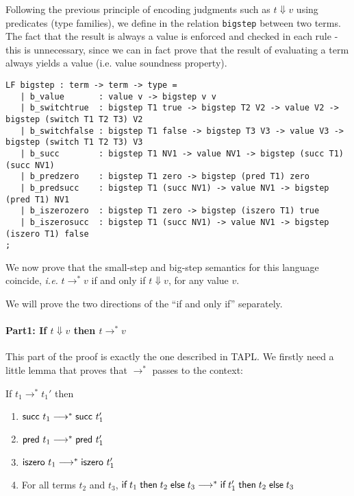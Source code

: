 Following the previous principle of encoding judgments such as $t \Downarrow v$
using predicates (type families), we define in \beluga the relation
\lstinline!bigstep! between two terms. The fact that the result is always a
value is enforced and checked in each rule - this is unnecessary, since we can
in fact prove that the result of evaluating a term always yields a value
(i.e. value soundness property).

\begin{lstlisting}
LF bigstep : term -> term -> type =
   | b_value       : value v -> bigstep v v
   | b_switchtrue  : bigstep T1 true -> bigstep T2 V2 -> value V2 -> bigstep (switch T1 T2 T3) V2
   | b_switchfalse : bigstep T1 false -> bigstep T3 V3 -> value V3 -> bigstep (switch T1 T2 T3) V3
   | b_succ        : bigstep T1 NV1 -> value NV1 -> bigstep (succ T1) (succ NV1)
   | b_predzero    : bigstep T1 zero -> bigstep (pred T1) zero
   | b_predsucc    : bigstep T1 (succ NV1) -> value NV1 -> bigstep (pred T1) NV1
   | b_iszerozero  : bigstep T1 zero -> bigstep (iszero T1) true
   | b_iszerosucc  : bigstep T1 (succ NV1) -> value NV1 -> bigstep (iszero T1) false
;
\end{lstlisting}

We now prove that the small-step and big-step semantics for this language
coincide, {\em i.e.} $t \rightarrow^* v$ if and only if $t \Downarrow v$, for
any value $v$.

We will prove the two directions of the ``if and only if'' separately.

\paragraph{Part1: If $t \Downarrow v$ then $t \rightarrow^* v$}
This part of the proof is exactly the one described in TAPL. We firstly need a
little lemma that proves that $\longrightarrow^*$ passes to the context:

\begin{lemma}[A.6]
  If $t_1 \rightarrow^* t_1'$ then
  \begin{enumerate}
    \item $\textsf{succ}~t_1 \longrightarrow^* \textsf{succ}~t_1'$
    \item $\textsf{pred}~t_1 \longrightarrow^* \textsf{pred}~t_1'$
    \item $\textsf{iszero}~t_1 \longrightarrow^* \textsf{iszero}~t_1'$
    \item For all terms $t_2$ and $t_3$,
      $\textsf{if\;} t_1 \textsf{\;then\;} t_2 \textsf{\;else\;} t_3 \longrightarrow^* \textsf{if\;} t_1' \textsf{\;then\;} t_2 \textsf{\;else\;} t_3$
  \end{enumerate}
\end{lemma}

